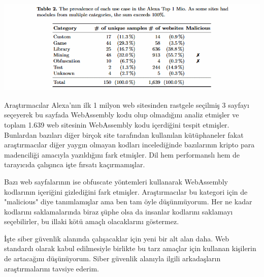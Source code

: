 \documentclass[11pt]{article}
\begin{document}
\begin{center}
\includegraphics[width=.9\linewidth]{gorseller/webassembly-kotu-amaclar.png}
\end{center}

Araştırmacılar Alexa'nın ilk 1 milyon web sitesinden rastgele seçilmiş 3
sayfayı seçeyerek bu sayfada WebAssembly kodu olup olmadığını analiz etmişler
ve toplam 1.639 web sitesinin WebAssembly kodu içerdiğini tespit etmişler.
Bunlardan bazıları diğer birçok site tarafından kullanılan kütüphaneler fakat
araştırmacılar diğer yaygın olmayan kodları incelediğinde bazılarının kripto
para madenciliği amacıyla yazıldığını fark etmişler. Dil hem performanslı hem
de tarayıcıda çalışınca işte fırsatı kaçırmamışlar.

Bazı web sayfalarının ise obfuscate yöntemleri kullanarak WebAssembly
kodlarının içeriğini gizlediğini fark etmişler. Araştırmacılar bu kategori için
de "malicious" diye tanımlamışlar ama ben tam öyle düşünmüyorum. Her ne kadar
kodlarını saklamalarında biraz şüphe olsa da insanlar kodlarını saklamayı
seçebilirler, bu illaki kötü amaçlı olacaklarını göstermez.

İşte siber güvenlik alanında çalışacaklar için yeni bir alt alan daha. Web
standardı olarak kabul edilmesiyle birlikte bu tarz amaçlar için kullanan
kişilerin de artacağını düşünüyorum. Siber güvenlik alanıyla ilgili
arkadaşların araştırmalarını tavsiye ederim.
\end{document}
